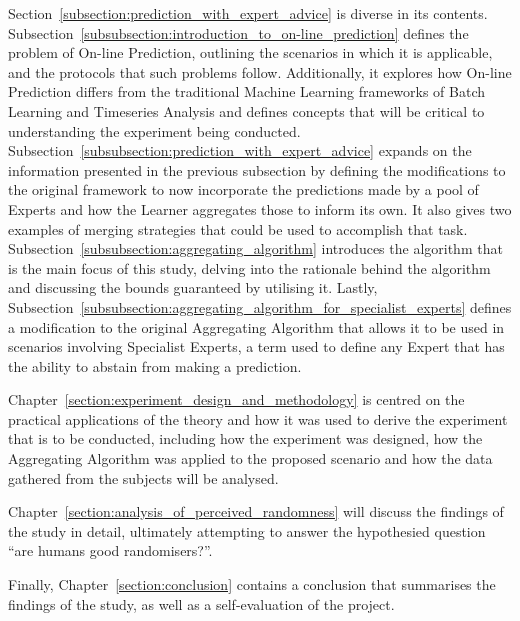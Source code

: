 Section~\ref{subsection:prediction_with_expert_advice} is diverse in its contents. Subsection~\ref{subsubsection:introduction_to_on-line_prediction} defines the problem of On-line Prediction, outlining the scenarios in which it is applicable, and the protocols that such problems follow. Additionally, it explores how On-line Prediction differs from the traditional Machine Learning frameworks of Batch Learning and Timeseries Analysis and defines concepts that will be critical to understanding the experiment being conducted. Subsection~\ref{subsubsection:prediction_with_expert_advice} expands on the information presented in the previous subsection by defining the modifications to the original framework to now incorporate the predictions made by a pool of Experts and how the Learner aggregates those to inform its own. It also gives two examples of merging strategies that could be used to accomplish that task. Subsection~\ref{subsubsection:aggregating_algorithm} introduces the algorithm that is the main focus of this study, delving into the rationale behind the algorithm and discussing the bounds guaranteed by utilising it. Lastly, Subsection~\ref{subsubsection:aggregating_algorithm_for_specialist_experts} defines a modification to the original Aggregating Algorithm that allows it to be used in scenarios involving Specialist Experts, a term used to define any Expert that has the ability to abstain from making a prediction.

Chapter~\ref{section:experiment_design_and_methodology} is centred on the practical applications of the theory and how it was used to derive the experiment that is to be conducted, including how the experiment was designed, how the Aggregating Algorithm was applied to the proposed scenario and how the data gathered from the subjects will be analysed.

Chapter~\ref{section:analysis_of_perceived_randomness} will discuss the findings of the study in detail, ultimately attempting to answer the hypothesied question ``are humans good randomisers?''.

Finally, Chapter~\ref{section:conclusion} contains a conclusion that summarises the findings of the study, as well as a self-evaluation of the project.
